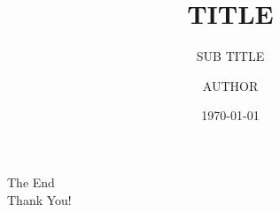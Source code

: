 \documentclass{beamer}
\title[TITLE]{TITLE}
\subtitle{SUB TITLE}
\author{AUTHOR}
\institute[SCHOOL]{SCHOOL COLLEGE UNIVERSITY}
\date{\today}
\begin{document}
\begin{frame}
\titlepage
\end{frame}

\begin{frame}
\begin{center}
\Huge The End\\
\Huge Thank You!
\end{center}
\end{frame}
\end{document}
